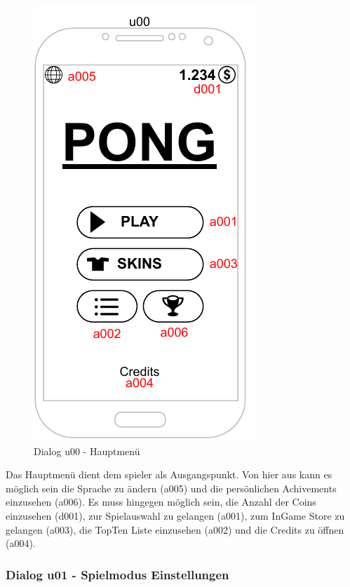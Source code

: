 \begin{figure}
    \begin{center}
    \includegraphics{diagramme/pdf/Mockup-u00.pdf}
    \end{center}
    \caption{Dialog u00 - Hauptmenü}
\end{figure}

Das Hauptmenü dient dem \gls{spieler} als Ausgangspunkt. Von hier aus kann es möglich sein die Sprache zu ändern (a005) und die persönlichen Achivements einzusehen (a006). 
Es muss hingegen möglich sein, die Anzahl der Coins einzusehen (d001), zur Spielauswahl zu gelangen (a001), zum InGame Store zu gelangen (a003), die TopTen Liste einzusehen (a002) und die Credits  zu öffnen (a004).

\clearpage

\subsubsection{Dialog u01 - Spielmodus Einstellungen}

